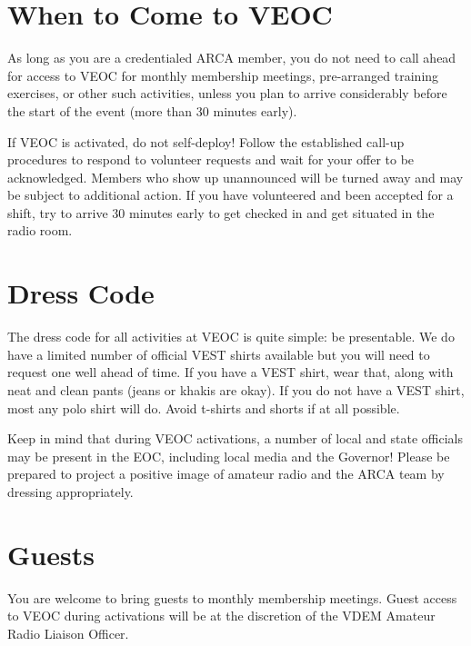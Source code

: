 \documentclass[pdflatex,letterpaper,twoside,12pt]{book}
\begin{document}
\section{When to Come to VEOC}

As long as you are a credentialed ARCA member, you do not need to call ahead for access to VEOC for monthly membership meetings, pre-arranged training exercises, or other such activities, unless you plan to arrive considerably before the start of the event (more than 30 minutes early).

If VEOC is activated, do not self-deploy!  Follow the established call-up procedures to respond to volunteer requests and wait for your offer to be acknowledged.  Members who show up unannounced will be turned away and may be subject to additional action.  If you have volunteered and been accepted for a shift, try to arrive 30 minutes early to get checked in and get situated in the radio room.


\section{Dress Code}

The dress code for all activities at VEOC is quite simple:  be presentable.  We do have a limited number of official VEST shirts available but you will need to request one well ahead of time.  If you have a VEST shirt, wear that, along with neat and clean pants (jeans or khakis are okay).  If you do not have a VEST shirt, most any polo shirt will do.  Avoid t-shirts and shorts if at all possible.

Keep in mind that during VEOC activations, a number of local and state officials may be present in the EOC, including local media and the Governor!  Please be prepared to project a positive image of amateur radio and the ARCA team by dressing appropriately.


\section{Guests}

You are welcome to bring guests to monthly membership meetings.  Guest access to VEOC during activations will be at the discretion of the VDEM Amateur Radio Liaison Officer.
\end{document}
